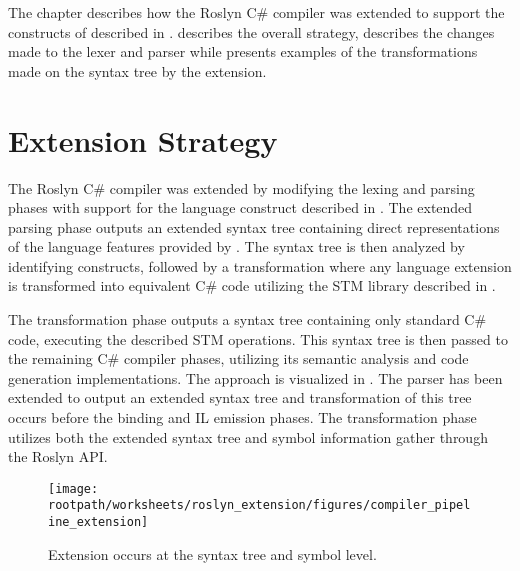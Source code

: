 \makeatletter {}\makeatother
{}
The chapter describes how the Roslyn C\# compiler was extended to support the constructs of \stmnamesp described in .  describes the overall strategy,  describes the changes made to the lexer and parser while  presents examples of the transformations made on the syntax tree by the extension.
\label{chap:roslyn_extension}
\section{Extension Strategy}
\label{sec:roslyn_extension_strategy}
The Roslyn C\# compiler was extended by modifying the lexing and parsing phases with support for the language construct described in . The extended parsing phase outputs an extended syntax tree containing direct representations of the language features provided by \stmname. The syntax tree is then analyzed by identifying \stmnamesp constructs, followed by a transformation where any language extension is transformed into equivalent C\# code utilizing the \ac{STM} library described in . 

The transformation phase outputs a syntax tree containing only standard C\# code, executing the described \ac{STM} operations. This syntax tree is then passed to the remaining C\# compiler phases, utilizing its semantic analysis and code generation implementations. The approach is visualized in . The parser has been extended to output an extended syntax tree and transformation of this tree occurs before the binding and IL emission phases. The transformation phase utilizes both the extended syntax tree and symbol information gather through the Roslyn \ac{API}.
\begin{figure}[htbp]
\centering
 \texttt{[image: \\rootpath/worksheets/roslyn\_extension/figures/compiler\_pipeline\_extension]} 
 \caption{Extension occurs at the syntax tree and symbol level.}
\label{fig:compiler_pipeline_extension}
\end{figure}

